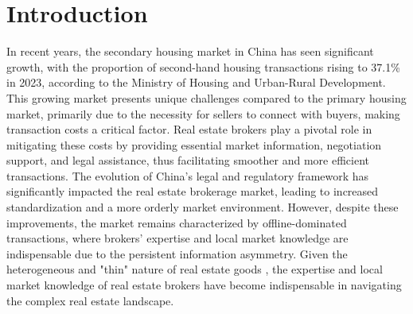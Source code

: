 \documentclass[11pt]{article}
\begin{document}
\thispagestyle{empty}

\clearpage
\egroup
\setcounter{page}{1}



\section{Introduction \label{sec:introduction}}

\noindent



In recent years, the secondary housing market in China has seen significant growth, with the proportion of second-hand housing transactions rising to 37.1\% in 2023, according to the Ministry of Housing and Urban-Rural Development. This growing market presents unique challenges compared to the primary housing market, primarily due to the necessity for sellers to connect with buyers, making transaction costs a critical factor. Real estate brokers play a pivotal role in mitigating these costs by providing essential market information, negotiation support, and legal assistance, thus facilitating smoother and more efficient transactions. The evolution of China's legal and regulatory framework has significantly impacted the real estate brokerage market, leading to increased standardization and a more orderly market environment. However, despite these improvements, the market remains characterized by offline-dominated transactions, where brokers' expertise and local market knowledge are indispensable due to the persistent information asymmetry. Given the heterogeneous and "thin" nature of real estate goods \citep{glaeser_real_2017, HAN2015813}, the expertise and local market knowledge of real estate brokers have become indispensable in navigating the complex real estate landscape.
\end{document}
